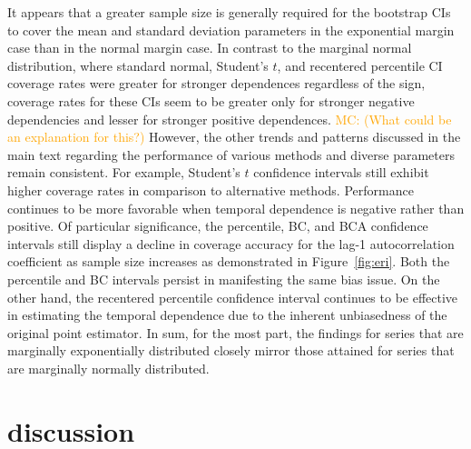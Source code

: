 \documentclass[10pt]{article}
\newcommand{\mc}[1]{\textcolor{orange}{MC: (#1)}}
\begin{document}
It appears that a greater sample size is generally required for the bootstrap
CIs to cover the mean and standard deviation parameters in the exponential
margin case than in the normal margin case. In contrast to the marginal normal
distribution, where standard normal, Student's $t$, and 
recentered percentile CI coverage rates were greater for stronger dependences 
regardless of the sign, coverage rates for these CIs seem to be greater only for 
stronger 
negative
dependencies and lesser for stronger positive dependences. 
\mc{What could be an explanation for this?}
However, the other 
trends 
and patterns
discussed in the main text regarding the performance of various methods and
diverse parameters remain consistent. For example, Student's $t$ confidence
intervals still exhibit higher coverage rates in comparison to alternative
methods. Performance continues to be more favorable when temporal dependence is
negative rather than positive. Of particular significance, the 
percentile, BC,
and BCA confidence intervals still display a decline in coverage accuracy for
the lag-1 autocorrelation coefficient as sample size increases as demonstrated
in Figure~\ref{fig:eri}. Both the percentile and BC intervals persist in
manifesting the same bias issue. On the other hand, the recentered percentile
confidence interval continues to be effective in estimating the temporal 
dependence 
due to the
inherent unbiasedness of the original point estimator. In sum, 
for the most part, the findings for
series that are marginally exponentially distributed closely mirror those
attained for series that are marginally normally distributed.
  
\section*{discussion}
\label{sec:disc}
\end{document}

